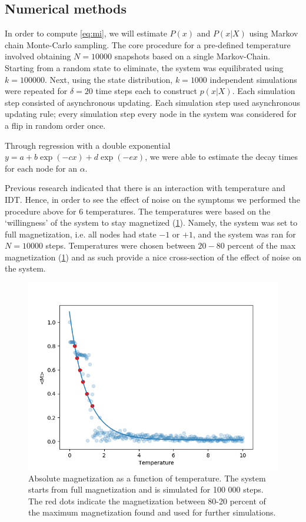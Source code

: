 \documentclass[twoside, twocolumn]{article}
\begin{document}
	\subsection{Numerical methods} \label{sec:numerical}
	In order to compute \ref{eq:mi}, we will estimate $P(x)$ and $P(x\vert X)$ using Markov chain Monte-Carlo sampling. The core procedure for a pre-defined temperature involved obtaining $N = 10 000$ snapshots based on a single Markov-Chain. Starting from a random state to eliminate, the system was equilibrated using $k = 100 000$. Next, using the state distribution, $k = 1000$ independent simulations were repeated for $\delta = 20$ time steps each to construct $p(x \vert X)$. Each simulation step consisted of asynchronous updating. Each simulation step used asynchronous updating rule; every simulation step every node in the system was considered for a flip in random order once. 
	
	Through regression with a double exponential $y = a + b\exp(-c x) + d \exp(- e x)$, we were able to estimate the decay times for each node for an $\alpha$.
	
	Previous research indicated that there is an interaction with temperature and IDT\cite{Quax2013}. Hence, in order to see the effect of noise on the symptoms we performed the procedure above for 6 temperatures. The temperatures were based on the `willingness' of the system to stay magnetized (\ref{fig:magnetizations}). Namely, the system was set to full magnetization, i.e. all nodes had state $-1$ or $+1$, and the system was ran for $N = 10 000$ steps. Temperatures were chosen between $20-80$ percent of the max magnetization (\ref{fig:magnetizations}) and as such provide a nice cross-section of the effect of noise on the system.   
	
	\begin{figure}[ht]
		\centering\includegraphics[width=\textwidth]{figures/magnetization-temp.png}
		\caption{Absolute magnetization as a function of temperature. The system starts from full magnetization and is simulated for 100 000 steps. The red dots indicate the magnetization between 80-20 percent of the maximum magnetization found and used for further simulations.}
		\label{fig:magnetizations}
	\end{figure}
	
\end{document}
